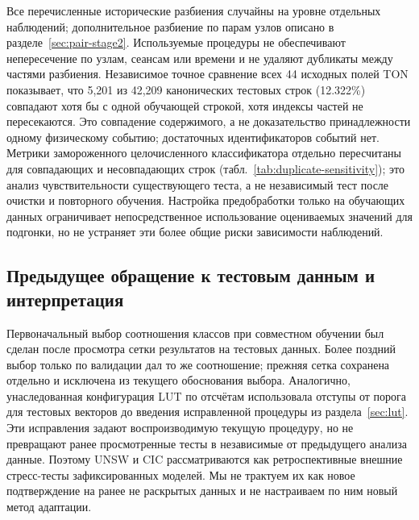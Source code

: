 Все перечисленные исторические разбиения случайны на уровне отдельных наблюдений; дополнительное разбиение по парам узлов описано в разделе~\ref{sec:pair-stage2}. Используемые процедуры не обеспечивают непересечение по узлам, сеансам или времени и не удаляют дубликаты между частями разбиения. Независимое точное сравнение всех 44 исходных полей TON показывает, что 5,201 из 42,209 канонических тестовых строк (12.322\%) совпадают хотя бы с одной обучающей строкой, хотя индексы частей не пересекаются. Это совпадение содержимого, а не доказательство принадлежности одному физическому событию; достаточных идентификаторов событий нет. Метрики замороженного целочисленного классификатора отдельно пересчитаны для совпадающих и несовпадающих строк (табл.~\ref{tab:duplicate-sensitivity}); это анализ чувствительности существующего теста, а не независимый тест после очистки и повторного обучения. Настройка предобработки только на обучающих данных ограничивает непосредственное использование оцениваемых значений для подгонки, но не устраняет эти более общие риски зависимости наблюдений.

\subsection{Предыдущее обращение к тестовым данным и интерпретация}
Первоначальный выбор соотношения классов при совместном обучении был сделан после просмотра сетки результатов на тестовых данных. Более поздний выбор только по валидации дал то же соотношение; прежняя сетка сохранена отдельно и исключена из текущего обоснования выбора. Аналогично, унаследованная конфигурация LUT по отсчётам использовала отступы от порога для тестовых векторов до введения исправленной процедуры из раздела~\ref{sec:lut}. Эти исправления задают воспроизводимую текущую процедуру, но не превращают ранее просмотренные тесты в независимые от предыдущего анализа данные. Поэтому UNSW и CIC рассматриваются как ретроспективные внешние стресс-тесты зафиксированных моделей. Мы не трактуем их как новое подтверждение на ранее не раскрытых данных и не настраиваем по ним новый метод адаптации.
